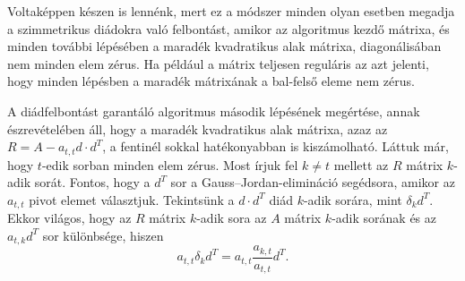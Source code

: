 \documentclass[a4paper, showtrims]{memoir}
\theoremstyle{plain}
\theoremstyle{remark}
\theoremstyle{definition}
\begin{document}
Voltaképpen készen is lennénk, 
mert ez a módszer minden olyan esetben megadja a szimmetrikus diádokra való felbontást,
amikor az algoritmus kezdő mátrixa, és minden további lépésében a maradék kvadratikus alak mátrixa,
diagonálisában nem minden elem zérus.
Ha például a mátrix teljesen reguláris az azt jelenti, 
hogy minden lépésben a maradék mátrixának a bal-felső eleme nem zérus.

A diádfelbontást garantáló algoritmus második lépésének megértése, 
annak észrevételében áll, hogy a maradék kvadratikus alak mátrixa, 
azaz az $R=A-a_{t,t}d\cdot d^T$, 
a fentinél sokkal hatékonyabban is kiszámolható.
Láttuk már, hogy $t$-edik sorban minden elem zérus.
Most írjuk fel $k\neq t$ mellett az $R$ mátrix $k$-adik sorát.
Fontos, hogy a $d^T$ sor a Gauss--Jordan-elimináció segédsora,
amikor az $a_{t,t}$ pivot elemet választjuk.
Tekintsünk a $d\cdot d^T$ diád $k$-adik sorára, mint $\delta_kd^T$. 
Ekkor világos, hogy az $R$ mátrix $k$-adik sora az $A$ mátrix $k$-adik sorának és az $a_{t,k}d^T$ sor különbsége,
hiszen
\[
    a_{t,t}\delta_kd^T
    =
    a_{t,t}\frac{a_{k,t}}{a_{t,t}}d^T.
\]
\end{document}
